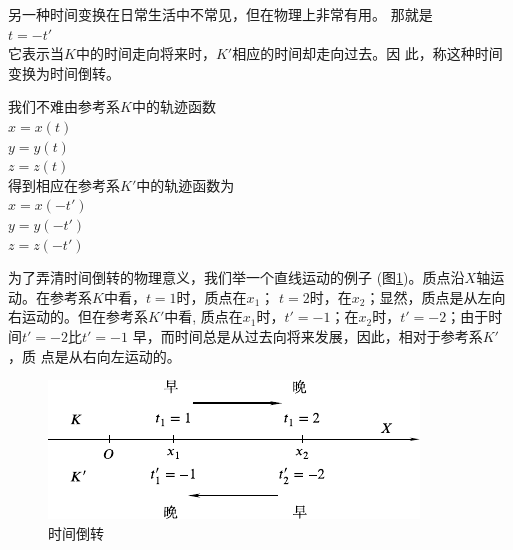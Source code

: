 另一种时间变换在日常生活中不常见，但在物理上非常有用。
那就是\vspace{-0.5em}
\\\null\hspace{6em}$t=-t'$\\
它表示当$K$中的时间走向将来时，$K'$相应的时间却走向过去。因
此，称这种时间变换为时间倒转。

我们不难由参考系$K$中的轨迹函数\vspace{-0.2em}
\\\null\hspace{6em}$x=x\left(t\right)$
\\\null\hspace{6em}$y=y\left(t\right)$
\\\null\hspace{6em}$z=z\left(t\right)$\\
得到相应在参考系$K'$中的轨迹函数为\vspace{-0.2em}
\\\null\hspace{6em}$x=x\left(-t'\right)$
\\\null\hspace{6em}$y=y\left(-t'\right)$
\\\null\hspace{6em}$z=z\left(-t'\right)$

为了弄清时间倒转的物理意义，我们举一个直线运动的例子
(图\ref{fig:02.05})。质点沿$X$轴运动。在参考系$K$中看，$t=1$时，质点在$x_1$；
$t=2$时，在$x_2$；显然，质点是从左向右运动的。但在参考系$K'$中看,
质点在$x_1$时，$t'=-1$；在$x_2$时，$t'=-2$；由于时间$t'=-2$比$t'=-1$
早，而时间总是从过去向将来发展，因此，相对于参考系$K'$，质
点是从右向左运动的。
\begin{figure}[h]
  \centering
  \includegraphics{figure/fig02.05}
  \caption{时间倒转}
  \label{fig:02.05}
\end{figure}
